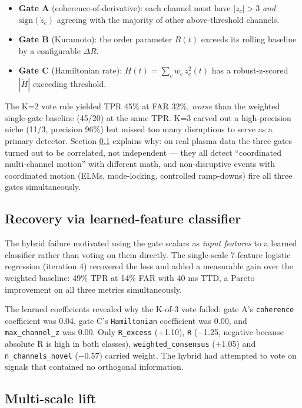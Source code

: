 \documentclass[11pt,letterpaper]{article}
\begin{document}
\begin{itemize}[leftmargin=*,itemsep=0pt]
\item \textbf{Gate A} (coherence-of-derivative): each channel must have
  $|z_c| > 3$ \emph{and} $\mathrm{sign}(\dot{z}_c)$ agreeing with the
  majority of other above-threshold channels.
\item \textbf{Gate B} (Kuramoto): the order parameter $R(t)$ exceeds its
  rolling baseline by a configurable $\Delta R$.
\item \textbf{Gate C} (Hamiltonian rate): $H(t) = \sum_c w_c\, z_c^2(t)$
  has a robust-z-scored $|\dot{H}|$ exceeding threshold.
\end{itemize}

The K=2 vote rule yielded TPR 45\% at FAR 32\%, \emph{worse} than the
weighted single-gate baseline (45/20) at the same TPR. K=3 carved out a
high-precision niche (11/3, precision 96\%) but missed too many
disruptions to serve as a primary detector. Section
\ref{ssec:learned} explains why: on real plasma data the three gates
turned out to be correlated, not independent --- they all detect
``coordinated multi-channel motion'' with different math, and
non-disruptive events with coordinated motion (ELMs, mode-locking,
controlled ramp-downs) fire all three gates simultaneously.

\subsection{Recovery via learned-feature classifier}\label{ssec:learned}

The hybrid failure motivated using the gate scalars as
\emph{input features} to a learned classifier rather than voting on them
directly. The single-scale 7-feature logistic regression (iteration 4)
recovered the loss and added a measurable gain over the weighted
baseline: 49\% TPR at 14\% FAR with 40 ms TTD, a Pareto improvement on
all three metrics simultaneously.

The learned coefficients revealed why the K-of-3 vote failed: gate A's
\texttt{coherence} coefficient was 0.04, gate C's \texttt{Hamiltonian}
coefficient was 0.00, and \texttt{max\_channel\_z} was 0.00. Only
\texttt{R\_excess} (+1.10), \texttt{R} (−1.25, negative because absolute
R is high in both classes), \texttt{weighted\_consensus} (+1.05) and
\texttt{n\_channels\_novel} (−0.57) carried weight. The hybrid had
attempted to vote on signals that contained no orthogonal information.

\subsection{Multi-scale lift}\label{ssec:multilift}
\end{document}
